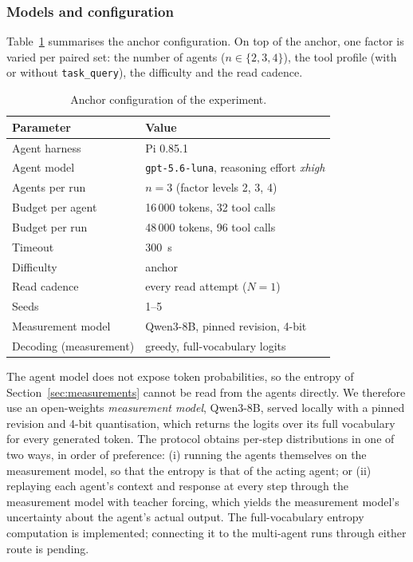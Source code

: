 \subsubsection{Models and configuration}

Table~\ref{tab:configuration} summarises the anchor configuration. On top of the anchor, one factor is varied per paired set: the number of agents ($n \in \{2, 3, 4\}$), the tool profile (with or without \texttt{task\_query}), the difficulty and the read cadence.

\begin{table}[t]
  \centering
  \small
  \caption{Anchor configuration of the experiment.}
  \label{tab:configuration}
  \begin{tabularx}{\columnwidth}{@{}lX@{}}
    \toprule
    Parameter & Value \\
    \midrule
    Agent harness & Pi 0.85.1 \\
    Agent model & \texttt{gpt-5.6-luna}, reasoning effort \emph{xhigh} \\
    Agents per run & $n = 3$ (factor levels 2, 3, 4) \\
    Budget per agent & 16\,000 tokens, 32 tool calls \\
    Budget per run & 48\,000 tokens, 96 tool calls \\
    Timeout & \SI{300}{\second} \\
    Difficulty & anchor \\
    Read cadence & every read attempt ($N = 1$) \\
    Seeds & 1--5 \\
    Measurement model & Qwen3-8B, pinned revision, 4-bit \\
    Decoding (measurement) & greedy, full-vocabulary logits \\
    \bottomrule
  \end{tabularx}
\end{table}

The agent model does not expose token probabilities, so the entropy of Section~\ref{sec:measurements} cannot be read from the agents directly. We therefore use an open-weights \emph{measurement model}, Qwen3-8B, served locally with a pinned revision and 4-bit quantisation, which returns the logits over its full vocabulary for every generated token. The protocol obtains per-step distributions in one of two ways, in order of preference: (i) running the agents themselves on the measurement model, so that the entropy is that of the acting agent; or (ii) replaying each agent's context and response at every step through the measurement model with teacher forcing, which yields the measurement model's uncertainty about the agent's actual output. The full-vocabulary entropy computation is implemented; connecting it to the multi-agent runs through either route is pending.

